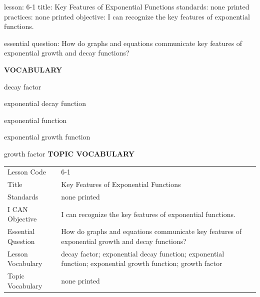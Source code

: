 \documentclass{article}
\newenvironment{lesson-meta}{}{}        %
\newcommand{\te}[1]{}                   %
\begin{document}
\begin{lesson-meta}
lesson: 6-1
title: Key Features of Exponential Functions
standards: none printed
practices: none printed
objective: I can recognize the key features of exponential functions.

essential question: How do graphs and equations communicate key features of exponential growth and decay functions?

\textbf{VOCABULARY}
\item decay factor
\item exponential decay function
\item exponential function
\item exponential growth function
\item growth factor
\textbf{TOPIC VOCABULARY}
\te{No separate topic vocabulary list is printed on these lesson pages.}
\begin{tabular}{ll}
Lesson Code & 6-1 \\
Title & Key Features of Exponential Functions \\
Standards & none printed \\
I CAN Objective & I can recognize the key features of exponential functions. \\
Essential Question & How do graphs and equations communicate key features of exponential growth and decay functions? \\
Lesson Vocabulary & decay factor; exponential decay function; exponential function; exponential growth function; growth factor \\
Topic Vocabulary & none printed \\
\end{tabular}
\end{lesson-meta}
\end{document}

